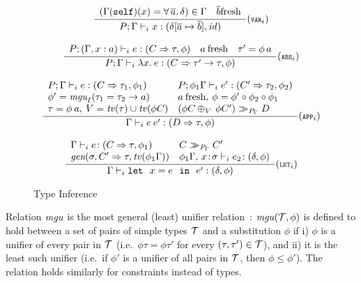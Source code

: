 \begin{figure}
\[ \begin{array}{cc}
      \displaystyle\frac
        {\begin{array}[t]{ll}
            (\Gamma(\self)(x) = \forall\,\overline{a}.\,\delta) \in \Gamma &
            \overline{b} \mbox{{\rm fresh}}
         \end{array}}
        {P;\Gamma \ti x: (\delta[\overline{a} \mapsto \overline{b}], \id)} (\VVARi) \\ \\

	\displaystyle\frac
          {\begin{array}[t]{lll}
            P;(\Gamma,x:a) \ti e: (C \Rightarrow \tau,\phi) & a\: \mbox{{\rm fresh}} & \tau' = \phi\,a
           \end{array}}
	  {P;\Gamma \ti \lambda x.\:e: (C\Rightarrow \tau' \rightarrow \tau, \phi)} (\ABSi) \\ \\

	\displaystyle\frac
	 {\begin{array}[t]{ll}
             P;\Gamma \ti e: (C \Rightarrow \tau_1, \phi_1) & P;\phi_1\Gamma \ti e': (C' \Rightarrow \tau_2, \phi_2)\\
             \phi' = \mguI(\tau_1 = \tau_2\rightarrow a) & a\: \mbox{{\rm fresh}}, \:
                \phi = \phi' \circ \phi_2 \circ \phi_1\:\: \  \\
             \tau = \phi\:a, \: V = \tv(\tau) \cup \tv(\phi C) & (\phi C \oplus_V\,\phi C') \simplifies{P_\Gamma} D
           \end{array}}
	  {\Gamma \ti e\:e': (D\Rightarrow \tau,\phi)} (\APPi) \\ \\

	\displaystyle\frac
	  {\begin{array}{ll}
             \Gamma \ti e\!:(C\Rightarrow \tau,\phi_1) & C \simplifies {P_\Gamma} C' \\
             \gen(\sigma,C'\Rightarrow \tau,\tv(\phi_1\Gamma)) & \phi_1\Gamma,\,x\!:\!\sigma \ti e_2\!:(\delta,\phi)
          \end{array}}
	 {\Gamma \ti \mlet\ x=e\ \iin\ e':(\delta,\phi)} (\LETi)
\end{array} \]
\caption{Type Inference}
\label{Type-inference-fig}
\end{figure}

Relation $\rm{\it mgu\/}$ is the most general (least) unifier
relation~\cite{Robinson65}: $\rm{\it mgu\/}(\cal T,\phi)$ is defined to hold
between a set of pairs of simple types $\cal T$ and a substitution
$\phi$ if i) $\phi$ is a unifier of every pair in $\cal T$ (i.e.~$\phi
\tau = \phi\tau'$ for every $(\tau,\tau')\in \cal T$), and ii) it is the
least such unifier (i.e.~if $\phi'$ is a unifier of all pairs in
$\cal T$, then $\phi\leq \phi'$). The relation holds similarly for
constraints instead of types.

